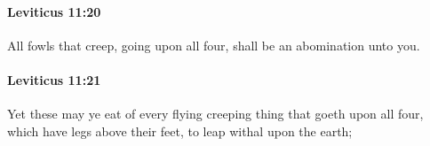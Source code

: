 		\paragraph{Leviticus 11:20} %
			\label{LEVITICUS-11-20}

			All fowls that creep, going upon all four, shall be an abomination unto you.


		\paragraph{Leviticus 11:21} %
			\label{LEVITICUS-11-21}

			Yet these may ye eat of every flying creeping thing that goeth upon all four, which have legs above their feet, to leap withal upon the earth;


